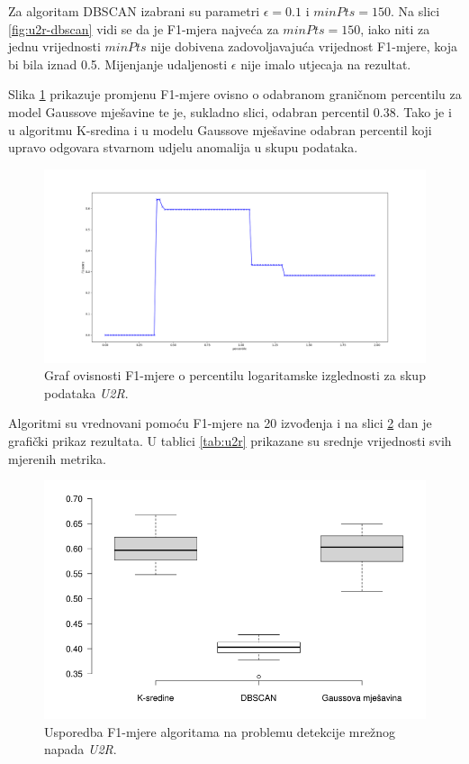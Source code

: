 \documentclass[utf8, diplomski, numeric]{fer}
\begin{document}
Za algoritam DBSCAN izabrani su parametri $\epsilon = 0.1$ i $minPts = 150$. Na slici \ref{fig:u2r-dbscan} vidi se da je F1-mjera najveća za $minPts = 150$, iako niti za jednu vrijednosti $minPts$ nije dobivena zadovoljavajuća vrijednost F1-mjere, koja bi bila iznad 0.5. Mijenjanje udaljenosti $\epsilon$ nije imalo utjecaja na rezultat.

Slika \ref{fig:u2r-gauss} prikazuje promjenu F1-mjere ovisno o odabranom graničnom percentilu za model Gaussove mješavine te je, sukladno slici, odabran percentil 0.38. Tako je i u algoritmu K-sredina i u modelu Gaussove mješavine odabran percentil koji upravo odgovara stvarnom udjelu anomalija u skupu podataka.

\begin{figure}[h!]
\includegraphics[width=1\textwidth]{images/u2r-gauss-f1.png}
\centering
\caption{Graf ovisnosti F1-mjere o percentilu logaritamske izglednosti za skup podataka \textit{U2R}.}
\label{fig:u2r-gauss}
\end{figure}

Algoritmi su vrednovani pomoću F1-mjere na 20 izvođenja i na slici \ref{fig:u2r-f1} dan je grafički prikaz rezultata. U tablici \ref{tab:u2r} prikazane su srednje vrijednosti svih mjerenih metrika. 

\begin{figure}[h!]
\includegraphics[width=1\textwidth]{images/u2r-f1.png}
\centering
\caption{Usporedba F1-mjere algoritama na problemu detekcije mrežnog napada \textit{U2R}.}
\label{fig:u2r-f1}
\end{figure}
\end{document}
